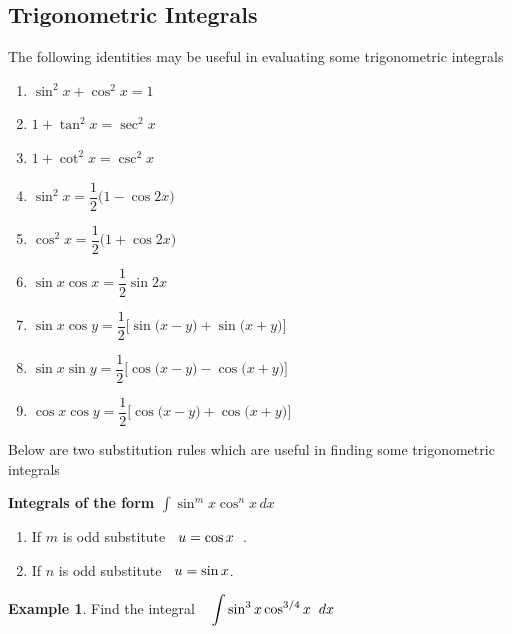 \documentclass[11pt,a4paper]{article}
\theoremstyle{definition}
\newtheorem{exa}[thm]{Example}
\newcommand{\subhead}[1]{%
  \par\medskip\noindent\textbf{#1}\par\nobreak\smallskip}
\begin{document}
\subsection{Trigonometric Integrals}
The following identities may be useful in evaluating some trigonometric integrals

\begin{enumerate}
\item $\sin^2x + \cos^2x = 1$

\item $1 + \tan^2x = \sec^2x$

\item $1 + \cot^2x = \csc^2x$

\item $\sin^2x = \dfrac{1}{2}\big(1 - \cos 2x\big)$

\item $\cos^2x = \dfrac{1}{2}\big(1 + \cos 2x\big)$

\item $\sin x \cos x = \dfrac{1}{2}\sin 2x$

\item $\sin x \cos y = \dfrac{1}{2}\Big[\sin\big(x - y\big) + \sin\big(x + y\big)\Big]$

\item $\sin x \sin y = \dfrac{1}{2}\Big[\cos\big(x - y\big) - \cos\big(x + y\big)\Big]$

\item $\cos x \cos y = \dfrac{1}{2}\Big[\cos \big(x - y\big) + \cos \big(x + y\big)\Big]$
\end{enumerate}

Below are two substitution rules which are useful in finding some trigonometric integrals
\subhead{Integrals of the form $\int \sin^m x\cos^n x\,dx$}
\begin{enumerate}
      \item[] If $m$ is odd substitute $\hspace{0.2cm} u = \cos x\hspace{0.2cm}$.
      \item[] If $n$ is odd substitute $\hspace{0.2cm} u = \sin x$.
\end{enumerate}

\begin{exa}
Find the integral $\hspace{0.3cm} \displaystyle{\int \sin^3x\cos^{3/4}x\hspace{0.2cm}dx}$
\end{exa}
\end{document}
